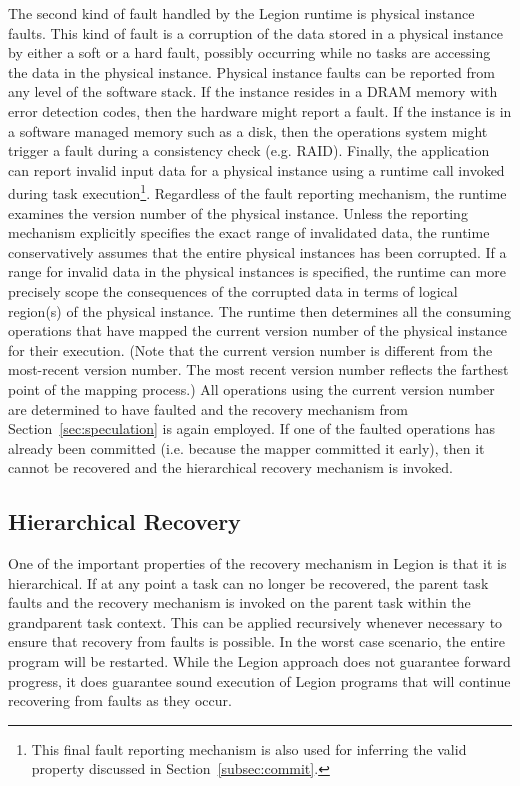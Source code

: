 The second kind of fault handled by the Legion runtime is 
physical instance faults. This kind of fault is a corruption
of the data stored in a physical instance by either a soft
or a hard fault, possibly occurring while no tasks are accessing
the data in the physical instance. Physical instance faults can be 
reported from any level of the software stack. If the instance resides 
in a DRAM memory with error detection codes, then the hardware
might report a fault. If the instance is in a software managed
memory such as a disk, then the operations system might
trigger a fault during a consistency check (e.g. RAID).
Finally, the application can report invalid input data
for a physical instance using a runtime call invoked during
task execution\footnote{This final fault reporting mechanism is
also used for inferring the valid property discussed in 
Section~\ref{subsec:commit}.}. Regardless of the fault
reporting mechanism, the runtime examines the version number
of the physical instance. Unless the reporting mechanism
explicitly specifies the exact range of invalidated data,
the runtime conservatively assumes that the entire physical
instances has been corrupted. If a range for invalid
data in the physical instances is specified, the runtime
can more precisely scope the consequences of the corrupted
data in terms of logical region(s) of the physical instance.
The runtime then determines all the consuming operations that 
have mapped the current version number of the physical instance 
for their execution. (Note that the current version number is
different from the most-recent version number. The most recent
version number reflects the farthest point of the mapping
process.) All operations using the current version number
are determined to have faulted and the recovery mechanism
from Section~\ref{sec:speculation} is again employed. If one
of the faulted operations has already been committed (i.e.
because the mapper committed it early), then it cannot
be recovered and the hierarchical recovery mechanism is invoked.

\subsection{Hierarchical Recovery}
\label{subsec:hierarchicalrecovery}
One of the important properties of the recovery mechanism in
Legion is that it is hierarchical. If at any point a task
can no longer be recovered, the parent task faults and 
the recovery mechanism is invoked on the parent task within
the grandparent task context. This can be applied recursively
whenever necessary to ensure that recovery from faults is
possible. In the worst case scenario, the entire program
will be restarted. While the Legion approach does not
guarantee forward progress, it does guarantee sound execution
of Legion programs that will continue recovering from faults
as they occur.

